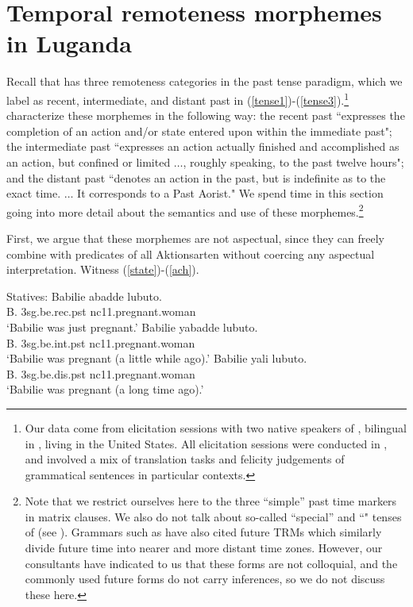 \documentclass[output=paper,
modfonts
]{langscibook}
\begin{document}
\section{Temporal remoteness morphemes in Luganda}\label{sec:bochnakklecha:3}


Recall that  has three remoteness categories in the past tense paradigm, which we label as {\sc recent}, {\sc intermediate}, and {\sc distant} past in (\ref{tense1})-(\ref{tense3}).\footnote{Our data come from elicitation sessions with two native speakers of , bilingual in , living in the United States. All elicitation sessions were conducted in , and involved a mix of translation tasks and felicity judgements of grammatical sentences in particular contexts. 
} \citet[122--123]{ashton54luganda} characterize these morphemes in the following way: the recent past ``expresses the completion of an action and/or state entered upon within the immediate past"; the intermediate past ``expresses an action actually finished and accomplished as an action, but confined or limited $\dots$, roughly speaking, to the past twelve hours"; and the distant past ``denotes an action in the past, but is indefinite as to the exact time. $\dots$ It corresponds to a Past Aorist." We spend time in this section going into more detail about the semantics and use of these morphemes.\footnote{Note that we restrict ourselves here to the three ``simple'' past time markers in matrix clauses. We also do not talk about so-called ``special'' and ``" tenses of  (see  \citealt{kisubika86tense}). Grammars such as \citet{ashton54luganda} have also cited future TRMs which similarly divide future time into nearer and more distant time zones. However, our consultants have indicated to us that these forms are not colloquial, and the commonly used future forms do not carry  inferences, so we do not discuss these here.}



First, we argue that these morphemes are not aspectual, since they can freely combine with predicates of all Aktionsarten without coercing any aspectual interpretation. Witness (\ref{state})-(\ref{ach}).



\ea\label{state} Statives:
  \ea\label{state-rec}
  \gll Babilie abadde lubuto.\\
  B. {\sc3sg}.be.{\sc rec.pst} {\sc nc11}.pregnant.woman\\
  \glt `Babilie was just pregnant.'
  \ex\label{state-int}
  \gll Babilie yabadde lubuto.\\
  B. {\sc3sg}.be.{\sc int.pst} {\sc nc11}.pregnant.woman\\
  \glt `Babilie was pregnant (a little while ago).'
  \ex\label{state-dis}
  \gll Babilie yali lubuto.\\
  B. {\sc3sg}.be.{\sc dis.pst} {\sc nc11}.pregnant.woman\\
  \glt `Babilie was pregnant (a long time ago).'
  \z
\z
\end{document}
